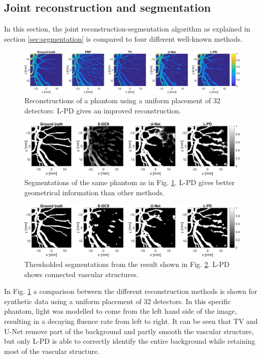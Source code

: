 \documentclass[journal]{IEEEtran}
\newcommand{\hl}[1]{\cbcolor{red}\begin{changebar}{\color{red} #1}\end{changebar}}
\begin{document}
\subsection{Joint reconstruction and segmentation}
In this section, the joint reconstruction-segmentation algorithm as explained in section \ref{sec:segmentation} is compared to four different well-known methods.

\begin{figure}[ht!]
\centering
\includegraphics[width=\linewidth]{images/paper_synthetic_recon.png}
\caption{Reconstructions of a phantom using a uniform placement of 32 detectors: L-PD gives an improved reconstruction.}
\label{fig:synth_recon}
\end{figure}

\hl{
\begin{figure}[ht!]
\centering
\includegraphics[width=0.8\linewidth]{images/paper_synthetic_segm.png}
\caption{Segmentations of the same phantom as in Fig. \ref{fig:synth_recon}. L-PD gives better geometrical information than other methods.}
\label{fig:synth_segm}
\end{figure}
}

\hl{
\begin{figure}[ht!]
\centering
\includegraphics[width=0.8\linewidth]{images/paper_synthetic_segm_binary.png}
\caption{Thresholded segmentations from the result shown in Fig. \ref{fig:synth_segm}. L-PD shows connected vascular structures.}
\label{fig:synth_segm_binary}
\end{figure}
}

In Fig. \ref{fig:synth_recon} a comparison between the different reconstruction methods is shown for synthetic data using a uniform placement of 32 detectors. In this specific phantom, light was modelled to come from the left hand side of the image, resulting in a decaying fluence rate from left to right. It can be seen that TV and U-Net remove part of the background and partly smooth the vascular structure, but only L-PD is able to correctly identify the entire background while retaining most of the vascular structure. 
\end{document}
